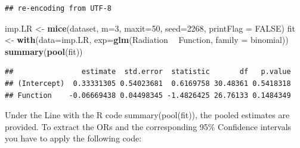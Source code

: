 \documentclass[]{book}
\newenvironment{Shaded}{\begin{snugshade}}{\end{snugshade}}
\newcommand{\KeywordTok}[1]{\textcolor[rgb]{0.13,0.29,0.53}{\textbf{#1}}}
\newcommand{\DataTypeTok}[1]{\textcolor[rgb]{0.13,0.29,0.53}{#1}}
\newcommand{\DecValTok}[1]{\textcolor[rgb]{0.00,0.00,0.81}{#1}}
\newcommand{\StringTok}[1]{\textcolor[rgb]{0.31,0.60,0.02}{#1}}
\newcommand{\CommentTok}[1]{\textcolor[rgb]{0.56,0.35,0.01}{\textit{#1}}}
\newcommand{\OtherTok}[1]{\textcolor[rgb]{0.56,0.35,0.01}{#1}}
\newcommand{\OperatorTok}[1]{\textcolor[rgb]{0.81,0.36,0.00}{\textbf{#1}}}
\newcommand{\NormalTok}[1]{#1}
\theoremstyle{definition}
\theoremstyle{definition}
\theoremstyle{definition}
\theoremstyle{remark}
\begin{document}
\begin{verbatim}
## re-encoding from UTF-8
\end{verbatim}

\begin{Shaded}
\begin{Highlighting}[]
\NormalTok{imp.LR <-}\StringTok{ }\KeywordTok{mice}\NormalTok{(dataset, }\DataTypeTok{m=}\DecValTok{3}\NormalTok{, }\DataTypeTok{maxit=}\DecValTok{50}\NormalTok{, }\DataTypeTok{seed=}\DecValTok{2268}\NormalTok{, }\DataTypeTok{printFlag =} \OtherTok{FALSE}\NormalTok{)}
\NormalTok{fit <-}\StringTok{ }\KeywordTok{with}\NormalTok{(}\DataTypeTok{data=}\NormalTok{imp.LR, }\DataTypeTok{exp=}\KeywordTok{glm}\NormalTok{(Radiation }\OperatorTok{~}\StringTok{ }\NormalTok{Function, }\DataTypeTok{family =}\NormalTok{ binomial))}
\KeywordTok{summary}\NormalTok{(}\KeywordTok{pool}\NormalTok{(fit))}
\end{Highlighting}
\end{Shaded}

\begin{verbatim}
##                estimate  std.error  statistic       df   p.value
## (Intercept)  0.33331305 0.54023681  0.6169758 30.48361 0.5418318
## Function    -0.06669438 0.04498345 -1.4826425 26.76133 0.1484349
\end{verbatim}

\begin{Shaded}
\end{Shaded}

Under the Line with the R code summary(pool(fit)), the pooled estimates
are provided. To extract the ORs and the corresponding 95\% Confidence
intervals you have to apply the following code:

\begin{Shaded}
\end{Shaded}
\end{document}
